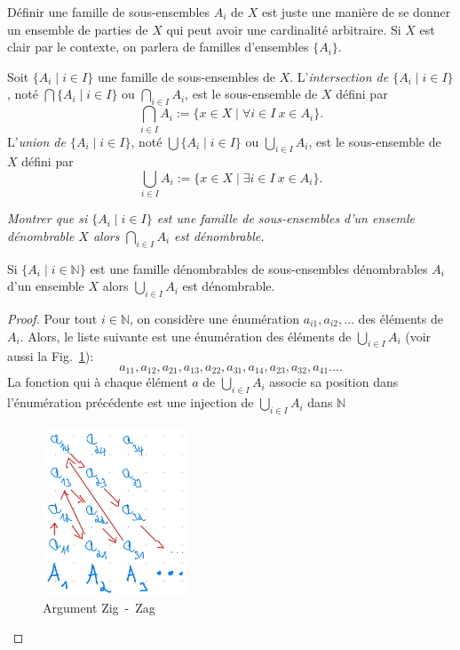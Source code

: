 \documentclass[french,course,oneside,theoremnosection]{lecture}
\newcommand{\N}{\mathbb{N}}
\begin{document}
Définir une famille de sous-ensembles ${A_i}$ de $X$ est juste une manière de se donner un ensemble de parties de $X$ qui peut avoir une cardinalité arbitraire. Si $X$ est clair par le contexte, on parlera de familles d'ensembles $\{A_i\}$.

\begin{definition}
Soit $\{A_i \mid i\in I\}$ une famille de sous-ensembles de $X$. L'\emph{intersection de $\{A_i \mid i \in I\}$}, noté $ \bigcap\{A_i \mid i\in I\}$ ou ${\bigcap}_{i\in I}A_i$, est le sous-ensemble de $X$ défini par
\[
{\bigcap}_{i\in I} A_i :=\{x \in X \mid \forall i \in I \ x \in A_i\}.
\]
L'\emph{union de $\{A_i \mid i \in I\}$}, noté $ \bigcup\{A_i \mid i\in I\}$ ou ${\bigcup}_{i\in I}A_i$, est le sous-ensemble de $X$ défini par
\[
{\bigcup}_{i\in I} A_i :=\{x \in X \mid \exists i \in I \ x \in A_i\}.
\]
\end{definition} 
\begin{exercise}
\emph{Montrer que si $\{A_i \mid i \in I\}$ est une famille de sous-ensembles d'un ensemle dénombrable $X$ alors ${\bigcap}_{i\in I} A_i$ est dénombrable.}
\end{exercise}

\begin{theorem}[AC]\label{thm:infinf}
Si $\{A_i\mid i \in \N\}$ est une famille dénombrables de sous-ensembles dénombrables $A_i$ d'un ensemble $X$ alors ${\bigcup}_{i\in I}A_i$ est dénombrable.
\end{theorem}
\begin{proof}
Pour tout $i \in \N$, on considère une énumération $a_{i1}, a_{i2}, \ldots$ des éléments de $A_i$. Alors, le liste suivante est une énumération des éléments de ${\bigcup}_{i \in I} A_i$ (voir aussi la Fig.~\ref{fig:zigzag}):
\[a_{11}, a_{12}, a_{21}, a_{13}, a_{22}, a_{31}, a_{14}, a_{23}, a_{32}, a_{41}\ldots. \]
La fonction qui à chaque élément $a$ de ${\bigcup}_{i \in I}A_i$ associe sa position dans l'énumération précédente est une injection de ${\bigcup}_{i \in I} A_i$ dans $\N$ 
\begin{figure}\centering
\includegraphics[height=5cm]{Img/zig-zag.png}
\caption{Argument Zig~-~Zag}\label{fig:zigzag}
\end{figure}
\end{proof}
\end{document}

